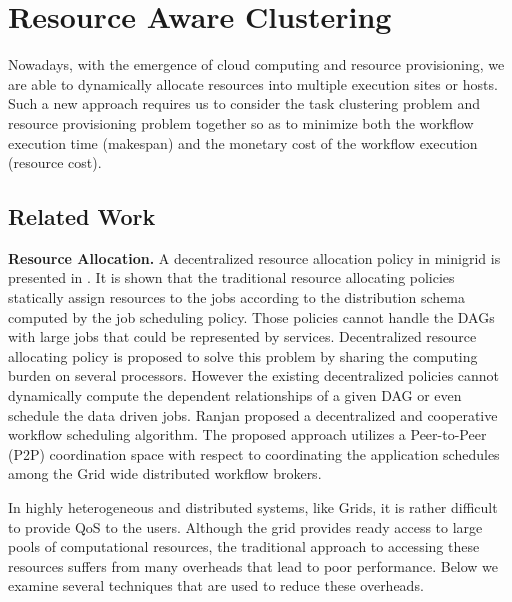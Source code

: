 \chapter{Resource Aware Clustering} 


Nowadays, with the emergence of cloud computing and resource provisioning, we are able to dynamically allocate resources into multiple execution sites or hosts. Such a new approach requires us to consider the task clustering problem and resource provisioning problem together so as to minimize both the workflow execution time (makespan) and the monetary cost of the workflow execution (resource cost).  


\section{Related Work}

\textbf{Resource Allocation.} A decentralized resource allocation policy in minigrid is presented in \cite{Yang2007}. It is shown that the traditional resource allocating policies statically assign resources to the jobs according to the distribution schema computed by the job scheduling policy. Those policies cannot handle the DAGs with large jobs that could be represented by services. Decentralized resource allocating policy is proposed to solve this problem by sharing the computing burden on several processors. However the existing decentralized policies cannot dynamically compute the dependent relationships of a given DAG or even schedule the data driven jobs. Ranjan \cite{Ranjan2008} proposed a decentralized and cooperative workflow scheduling algorithm. The proposed approach utilizes a Peer-to-Peer (P2P) coordination space with respect to coordinating the application schedules among the Grid wide distributed workflow brokers. 


In highly heterogeneous and distributed systems, like Grids, it is rather difficult to provide QoS to the users. Although the grid provides ready access to large pools of computational resources, the traditional approach to accessing these resources suffers from many overheads that lead to poor performance. Below we examine several techniques that are used to reduce these overheads. 

